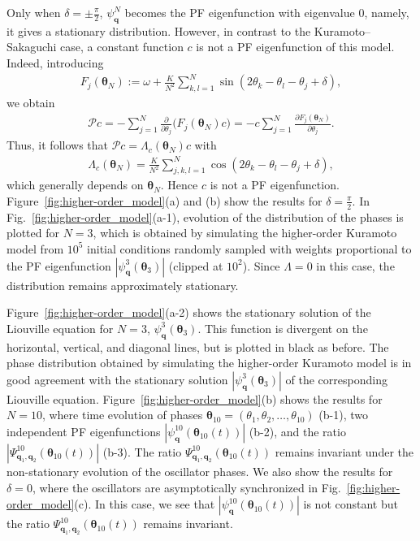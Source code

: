 \documentclass[
amsmath,amssymb,
]{revtex4-2}
\begin{document}
Only when $\delta = \pm \frac{\pi}{2}$, $\psi^N_{\bm{q}}$ becomes the PF eigenfunction with eigenvalue $0$, namely, it gives a stationary distribution. 
%
However, in contrast to the Kuramoto--Sakaguchi case, a constant function $c$ is not a PF eigenfunction of this model.
Indeed, introducing
\begin{align}
F_j(\bm{\theta}_N)
:= \omega + \frac{K}{N^2}\sum_{k,l=1}^{N}\sin(2\theta_k-\theta_l-\theta_j+\delta),
\end{align}
we obtain %
\begin{align}
\mathcal{P}c
= -\sum_{j=1}^{N}\frac{\partial}{\partial\theta_j}\bigl(F_j(\bm{\theta}_N)c\bigr)
= -c\sum_{j=1}^{N}\frac{\partial F_j(\bm{\theta}_N)}{\partial\theta_j}.
\end{align}
Thus, it follows that $\mathcal{P}c = \Lambda_c(\bm{\theta}_N)c$ with
\begin{align}
\Lambda_c(\bm{\theta}_N)
= \frac{K}{N^2}\sum_{j,k,l=1}^{N}\cos(2\theta_k-\theta_l-\theta_j+\delta),
\end{align}
which generally depends on $\bm{\theta}_N$. Hence $c$ is not a PF eigenfunction.
%
Figure~\ref{fig:higher-order_model}(a) and (b) show the results for $\delta = \frac{\pi}{2}$.
%
In Fig.~\ref{fig:higher-order_model}(a-1), evolution of the distribution of the phases is plotted for $N=3$, which is obtained by simulating the higher-order Kuramoto model from $10^5$ initial conditions randomly sampled with weights proportional to the PF eigenfunction $\left|\psi^3_{\bm{q}}({\bm \theta}_3)\right|$ (clipped at $10^2$). Since $\Lambda = 0$ in this case, the distribution remains approximately stationary.
\par

Figure~\ref{fig:higher-order_model}(a-2) shows the stationary solution of the Liouville equation for $N=3$,
$\psi^3_{\bm{q}}({\bm \theta}_3)$.
%
This function is divergent on the horizontal, vertical, and diagonal lines, but is plotted in black as before.
%
The phase distribution obtained by simulating the higher-order Kuramoto model is in good agreement with the stationary solution $\left|\psi^3_{\bm {q}}(\bm{\theta}_{3})\right|$ of the corresponding Liouville equation.
%
Figure~\ref{fig:higher-order_model}(b) shows the results for $N=10$, where time evolution of 
phases $\bm{\theta}_{10} = (\theta_1, \theta_2, \ldots, \theta_{10})$ (b-1),
two independent PF eigenfunctions $\left|\psi^{10}_{\bm{q}}(\bm{\theta}_{10}(t))\right|$ 
(b-2),
and the ratio $\left|\Psi^{10}_{\bm{q}_1,\bm{q}_2}(\bm{\theta}_{10}(t))\right|$ (b-3).
%
The ratio $\Psi^{10}_{\bm{q}_1,\bm{q}_2}(\bm{\theta}_{10}(t))$ remains invariant under the non-stationary evolution of the oscillator phases.
% 
We also show the results for $\delta = 0$, where the oscillators are asymptotically synchronized in Fig.~\ref{fig:higher-order_model}(c). In this case, we see that $\left|\psi^{10}_{\bm{q}}(\bm{\theta}_{10}(t))\right|$ is not constant but the ratio $\Psi^{10}_{\bm{q}_1,\bm{q}_2}(\bm{\theta}_{10}(t))$ remains invariant.
\end{document}
